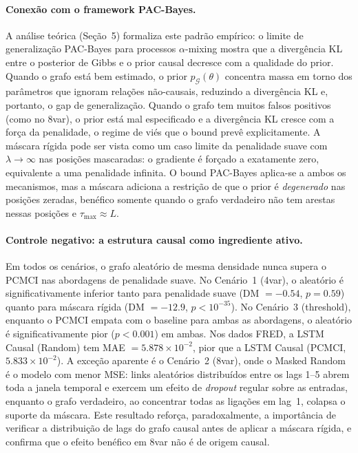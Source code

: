 \documentclass[12pt, a4paper]{article}
\begin{document}
\paragraph{Conexão com o framework PAC-Bayes.}
A análise teórica (Seção~5) formaliza este padrão empírico: o limite de generalização PAC-Bayes para processos $\alpha$-mixing mostra que a divergência KL entre o posterior de Gibbs e o prior causal decresce com a qualidade do prior. Quando o grafo está bem estimado, o prior $p_{\mathcal{G}}(\theta)$ concentra massa em torno dos parâmetros que ignoram relações não-causais, reduzindo a divergência KL e, portanto, o gap de generalização. Quando o grafo tem muitos falsos positivos (como no 8var), o prior está mal especificado e a divergência KL cresce com a força da penalidade, o regime de viés que o bound prevê explicitamente. A máscara rígida pode ser vista como um caso limite da penalidade suave com $\lambda \to \infty$ nas posições mascaradas: o gradiente é forçado a exatamente zero, equivalente a uma penalidade infinita. O bound PAC-Bayes aplica-se a ambos os mecanismos, mas a máscara adiciona a restrição de que o prior é \emph{degenerado} nas posições zeradas, benéfico somente quando o grafo verdadeiro não tem arestas nessas posições e $\tau_{\max} \approx L$.

\paragraph{Controle negativo: a estrutura causal como ingrediente ativo.}
Em todos os cenários, o grafo aleatório de mesma densidade nunca supera o PCMCI nas abordagens de penalidade suave. No Cenário~1 (4var), o aleatório é significativamente inferior tanto para penalidade suave (DM $= -0.54$, $p = 0.59$) quanto para máscara rígida (DM $= -12.9$, $p < 10^{-35}$). No Cenário~3 (threshold), enquanto o PCMCI empata com o baseline para ambas as abordagens, o aleatório é significativamente pior ($p < 0.001$) em ambas. Nos dados FRED, a LSTM Causal (Random) tem MAE $= 5.878 \times 10^{-2}$, pior que a LSTM Causal (PCMCI, $5.833 \times 10^{-2}$). A exceção aparente é o Cenário~2 (8var), onde o Masked Random é o modelo com menor MSE: links aleatórios distribuídos entre os lags 1--5 abrem toda a janela temporal e exercem um efeito de \emph{dropout} regular sobre as entradas, enquanto o grafo verdadeiro, ao concentrar todas as ligações em lag~1, colapsa o suporte da máscara. Este resultado reforça, paradoxalmente, a importância de verificar a distribuição de lags do grafo causal antes de aplicar a máscara rígida, e confirma que o efeito benéfico em 8var não é de origem causal.
\end{document}
